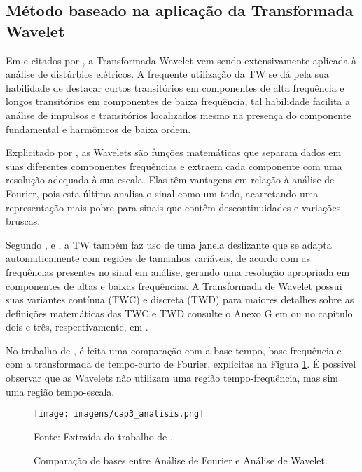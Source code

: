 \subsection{Método baseado na aplicação da Transformada Wavelet}
\par
Em %
e \cite{IAN09} citados por \cite{FER10}, a Transformada Wavelet vem sendo extensivamente aplicada à análise de distúrbios elétricos. A frequente utilização da TW se dá pela sua habilidade de destacar curtos transitórios em componentes de alta frequência e longos transitórios em componentes de baixa frequência, tal habilidade facilita a análise de impulsos e transitórios localizados mesmo na presença do componente fundamental e harmônicos de baixa ordem. 
\par
Explicitado por \cite{OLI07}, as Wavelets são funções matemáticas que separam dados em suas diferentes componentes frequências e extraem cada componente com uma resolução adequada à sua escala. Elas têm vantagens em relação à análise de Fourier, pois esta última analisa o sinal como um todo, acarretando uma representação mais pobre para sinais que contêm descontinuidades e variações bruscas.
\par
Segundo \cite{MEN08}, \cite{OLI07} e \cite{FER10}, a TW também faz uso de uma janela deslizante que se adapta automaticamente com regiões de tamanhos variáveis, de acordo com as frequências presentes no sinal em análise, gerando uma resolução apropriada em componentes de altas e baixas frequências. A Transformada de Wavelet possui suas variantes contínua (TWC) e discreta (TWD) para maiores detalhes sobre as definições matemáticas das TWC e TWD consulte o Anexo G em \cite{FER10} ou no capitulo dois e três, respectivamente, em \cite{OLI07}. 
\par
No trabalho de \cite{MEN08}, é feita uma comparação com a base-tempo, base-frequência e com a transformada de tempo-curto de Fourier, explicitas na Figura \ref{fig:analisis}. É possível observar que as Wavelets não utilizam uma região tempo-frequência, mas sim uma região tempo-escala.
\begin{figure}[!h]
\begin{center}
\caption{Comparação de bases entre Análise de Fourier e Análise de Wavelet.}
\texttt{[image: imagens/cap3\_analisis.png]}
\par{\small Fonte: Extraída do trabalho de \cite{MEN08}.}
\label{fig:analisis}
\end{center}
\end{figure}
